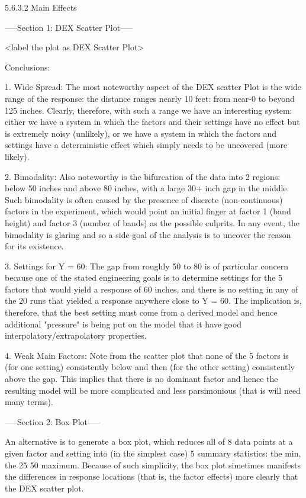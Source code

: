5.6.3.2 Main Effects

-----Section 1: DEX Scatter Plot-----

<label the plot as DEX Scatter Plot>

Conclusions:

1. Wide Spread: The most noteworthy aspect of the
   DEX scatter Plot is the wide range of the
   response: the distance ranges nearly 10 feet:
   from near-0 to beyond 125 inches.  Clearly,
   therefore, with such a range we have an
   interesting system: either we have a system in
   which the factors and their settings have no
   effect but is extremely noisy (unlikely), or we
   have a system in which the factors and settings
   have a deterministic effect which simply needs
   to be uncovered (more likely).

2. Bimodality: Also noteworthy is the bifurcation
   of the data into 2 regions: below 50 inches and
   above 80 inches, with a large 30+ inch gap in
   the middle.  Such bimodality is often caused by
   the presence of discrete (non-continuous)
   factors in the experiment, which would point an
   initial finger at factor 1 (band height) and
   factor 3 (number of bands) as the possible
   culprits.  In any event, the bimodality is
   glaring and so a side-goal of the analysis is
   to uncover the reason for its existence.

3. Settings for Y = 60: The gap from roughly 50 to
   80 is of particular concern because one of the
   stated engineering goals is to determine
   settings for the 5 factors that would yield a
   response of 60 inches, and there is no setting
   in any of the 20 runs that yielded a response
   anywhere close to Y = 60.  The implication is,
   therefore, that the best setting must come from
   a derived model and hence additional "pressure"
   is being put on the model that it have good
   interpolatory/extrapolatory properties.

4. Weak Main Factors: Note from the scatter plot
   that none of the 5 factors is (for one setting)
   consistently below and then (for the other
   setting) consistently above the gap.  This
   implies that there is no dominant factor and
   hence the resulting model will be more
   complicated and less parsimonious (that is will
   need many terms).

-----Section 2: Box Plot-----

An alternative is to generate a box plot, which
reduces all of 8 data points at a given factor
and setting into (in the simplest case) 5
summary statistics: the min, the 25%
50%
maximum.  Because of such simplicity, the box plot simetimes manifests
the differences in response locations (that is, the factor effects)
more clearly that the DEX scatter plot.

